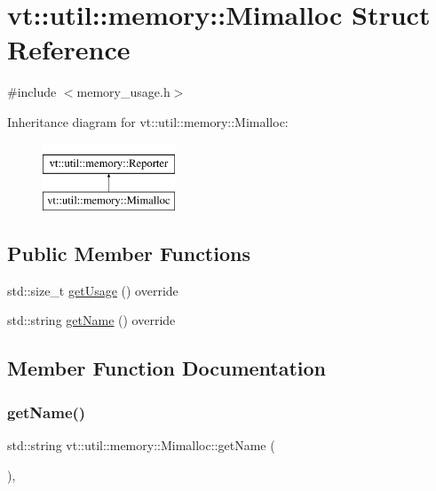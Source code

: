 \hypertarget{structvt_1_1util_1_1memory_1_1_mimalloc}{}\section{vt\+:\+:util\+:\+:memory\+:\+:Mimalloc Struct Reference}
\label{structvt_1_1util_1_1memory_1_1_mimalloc}


{\ttfamily \#include $<$memory\+\_\+usage.\+h$>$}

Inheritance diagram for vt\+:\+:util\+:\+:memory\+:\+:Mimalloc\+:\begin{figure}[H]
\begin{center}
\leavevmode
\includegraphics[height=2.000000cm]{structvt_1_1util_1_1memory_1_1_mimalloc}
\end{center}
\end{figure}
\subsection*{Public Member Functions}
\begin{DoxyCompactItemize}
\item 
std\+::size\+\_\+t \hyperlink{structvt_1_1util_1_1memory_1_1_mimalloc_ab404700265f120eedb4cf06e4ae0b602}{get\+Usage} () override
\item 
std\+::string \hyperlink{structvt_1_1util_1_1memory_1_1_mimalloc_a94ad64b69062aeae79fa2d2067cf27f1}{get\+Name} () override
\end{DoxyCompactItemize}


\subsection{Member Function Documentation}
\mbox{\label{structvt_1_1util_1_1memory_1_1_mimalloc_a94ad64b69062aeae79fa2d2067cf27f1}} 
\subsubsection{\texorpdfstring{get\+Name()}{getName()}}
{\footnotesize\ttfamily std\+::string vt\+::util\+::memory\+::\+Mimalloc\+::get\+Name (\begin{DoxyParamCaption}{ }\end{DoxyParamCaption})\hspace{0.3cm}{\ttfamily [override]}, {\ttfamily [virtual]}}



